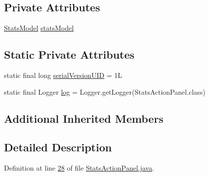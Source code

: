 \subsection*{Private Attributes}
\begin{DoxyCompactItemize}
\item 
\hyperlink{classcom_1_1poly_1_1nlp_1_1filekommander_1_1views_1_1models_1_1_stats_model}{Stats\-Model} \hyperlink{classcom_1_1poly_1_1nlp_1_1filekommander_1_1views_1_1panels_1_1_stats_action_panel_aaefc874fb6203949c9a759791eaf06b3}{stats\-Model}
\end{DoxyCompactItemize}
\subsection*{Static Private Attributes}
\begin{DoxyCompactItemize}
\item 
static final long \hyperlink{classcom_1_1poly_1_1nlp_1_1filekommander_1_1views_1_1panels_1_1_stats_action_panel_ae7f395a4db15fdb7194b11934cd0732a}{serial\-Version\-U\-I\-D} = 1\-L
\item 
static final Logger \hyperlink{classcom_1_1poly_1_1nlp_1_1filekommander_1_1views_1_1panels_1_1_stats_action_panel_a9d905505e7514da823b65ce32d31d22e}{log} = Logger.\-get\-Logger(Stats\-Action\-Panel.\-class)
\end{DoxyCompactItemize}
\subsection*{Additional Inherited Members}


\subsection{Detailed Description}


Definition at line \hyperlink{L28}{28} of file \hyperlink{}{Stats\-Action\-Panel.\-java}.



